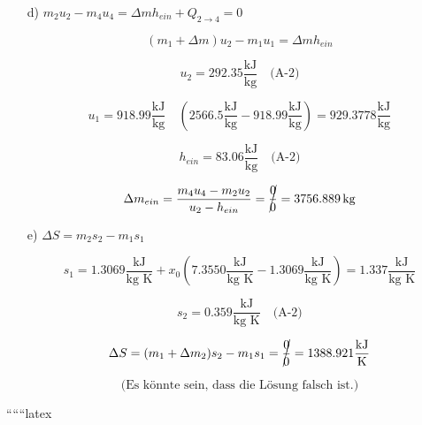 \begin{itemize}
    \item[d)] $m_2 u_2 - m_4 u_4 = \Delta m h_{ein} + Q_{2 \rightarrow 4} = 0$
    
    \[
    (m_1 + \Delta m) u_2 - m_1 u_1 = \Delta m h_{ein}
    \]
    
    \[
    u_2 = 292.35 \frac{\text{kJ}}{\text{kg}} \quad \text{(A-2)}
    \]
    
    \[
    u_1 = 918.99 \frac{\text{kJ}}{\text{kg}} \quad (2566.5 \frac{\text{kJ}}{\text{kg}} - 918.99 \frac{\text{kJ}}{\text{kg}}) = 929.3778 \frac{\text{kJ}}{\text{kg}}
    \]
    
    \[
    h_{ein} = 83.06 \frac{\text{kJ}}{\text{kg}} \quad \text{(A-2)}
    \]
    
    \[
    \Delta m_{ein} = \frac{m_4 u_4 - m_2 u_2}{u_2 - h_{ein}} = \cancel{\frac{0}{0}} = 3756.889 \, \text{kg}
    \]
    
    \item[e)] $\Delta S = m_2 s_2 - m_1 s_1$
    
    \[
    s_1 = 1.3069 \frac{\text{kJ}}{\text{kg K}} + x_0 (7.3550 \frac{\text{kJ}}{\text{kg K}} - 1.3069 \frac{\text{kJ}}{\text{kg K}}) = 1.337 \frac{\text{kJ}}{\text{kg K}}
    \]
    
    \[
    s_2 = 0.359 \frac{\text{kJ}}{\text{kg K}} \quad \text{(A-2)}
    \]
    
    \[
    \Delta S = (m_1 + \Delta m_2) s_2 - m_1 s_1 = \cancel{\frac{0}{0}} = 1388.921 \frac{\text{kJ}}{\text{K}}
    \]
    
    \[
    \text{(Es könnte sein, dass die Lösung falsch ist.)}
    \]
    
\end{itemize}

``````latex



